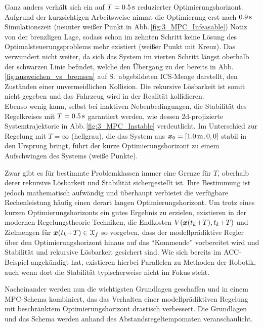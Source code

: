 Ganz anders verhält sich ein auf $T = \unit[0.5]{s}$ reduzierter Optimierungshorizont. Aufgrund der kurzsichtigen Arbeitsweise nimmt die Optimierung erst nach $\unit[0.9]{s}$ Simulationszeit (neunter weißer Punkt in Abb.\,\ref{fig:3_MPC_Infeasable}) Notiz von der brenzligen Lage, sodass schon im zehnten Schritt keine Lösung des Optimalsteuerungsproblems mehr existiert (weißer Punkt mit Kreuz). Das verwundert nicht weiter, da sich das System  im vierten Schritt längst oberhalb der schwarzen Linie befindet, welche den Übergang zu der bereits in Abb.\,\ref{fig:ausweichen_vs_bremsen} auf S.\,\pageref{fig:ausweichen_vs_bremsen} abgebildeten ICS-Menge darstellt, den Zuständen einer unvermeidlichen Kollision. Die rekursive Lösbarkeit ist somit nicht gegeben und das Fahrzeug wird in der Realität kollidieren. \\
Ebenso wenig kann, selbst bei inaktiven Nebenbedingungen, die Stabilität des Regelkreises mit $T = \unit[0.5]{s}$ garantiert werden, wie dessen 2d-projizierte Systemtrajektorie in Abb.\,\ref{fig:3_MPC_Instable} verdeutlicht. Im Unterschied zur Regelung mit $T = \infty$ (hellgrau), die das System aus $\bs x_0 = [\unit[1.0]{m}, 0, 0]$ stabil in den Ursprung bringt, führt der kurze Optimierungshorizont zu einem Aufschwingen des Systems (weiße Punkte).

Zwar gibt es für bestimmte Problemklassen immer eine Grenze für $T$, oberhalb derer rekursive Lösbarkeit und Stabilität sichergestellt ist. Ihre Bestimmung ist jedoch mathematisch aufwändig \cite{graichen2014SkriptOpt} und überhaupt verbietet die verfügbare Rechenleistung häufig einen derart langen Optimierungshorizont. 
Um trotz eines kurzen Optimierungshorizonts ein gutes Ergebnis zu erzielen, existieren in der modernen Regelungstheorie Techniken, die Endkosten $V(\boldsymbol{x}(t_k\!+\!T), t_k\!+\!T)$ und Zielmengen für $\boldsymbol{x}(t_k\!+\!T) \in \mathcal{X}_f$ so vorgeben, dass der modellprädiktive Regler über den Optimierungshorizont hinaus auf das "`Kommende"' vorbereitet wird und Stabilität und rekursive Lösbarkeit gesichert sind. Wie sich bereits im ACC-Beispiel angekündigt hat, existieren hierbei Parallelen zu Methoden der Robotik, auch wenn dort die Stabilität typischerweise nicht im Fokus steht.

Nacheinander werden nun die wichtigsten Grundlagen geschaffen und in einem MPC-Schema kombiniert, das das Verhalten einer modellprädiktiven Regelung mit beschränktem Optimierungshorizont drastisch verbessert. Die Grundlagen und das Schema werden anhand des Abstandsregeltempomaten veranschaulicht.

